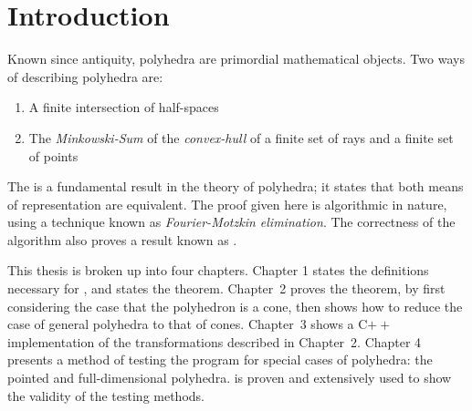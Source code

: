 \chapter*{Introduction}

Known since antiquity, polyhedra are primordial mathematical objects.  Two ways of describing polyhedra are:
\begin{enumerate}
  \item A finite intersection of half-spaces
  \item The \textit{Minkowski-Sum} of the \textit{convex-hull} of a finite set of rays and a finite set of points
\end{enumerate}
The {\MWT} is a fundamental result in the theory of polyhedra; it states that both means of representation are equivalent.  The proof given here is algorithmic in nature, using a technique known as \textit{Fourier-Motzkin elimination}.  The correctness of the algorithm also proves a result known as .

This thesis is broken up into four chapters.  Chapter 1 states the definitions necessary for {\MWT}, and states the theorem.  Chapter~2 proves the theorem, by first considering the case that the polyhedron is a cone, then shows how to reduce the case of general polyhedra to that of cones.  Chapter~3 shows a C$++$ implementation of the transformations described in Chapter~2.  Chapter 4 presents a method of testing the program for special cases of polyhedra: the pointed and full-dimensional polyhedra.   is proven and extensively used to show the validity of the testing methods.

